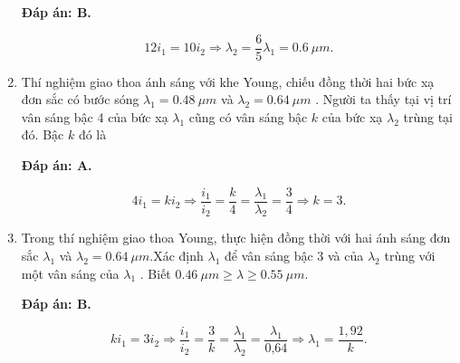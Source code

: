 \begin{enumerate}[label=\bfseries Câu \arabic*:]
{		
	}
	
	\loigiai
	{		\textbf{Đáp án: B.}
		
		$$12i_1 = 10i_2 \Rightarrow \lambda_2 = \dfrac{6}{5} \lambda_1 = \SI{0,6}{\mu m}.$$
	}
		\item {} 
	\cauhoi
	{Thí nghiệm giao thoa ánh sáng với khe Young, chiếu đồng thời hai bức xạ đơn sắc có bước sóng $\lambda_1 = \SI{0,48}{\mu m}$  và $\lambda_2 = \SI{0,64}{\mu m}$  . Người ta thấy tại vị trí vân sáng bậc 4 của bức xạ $\lambda_1$ cũng có vân sáng bậc $k$ của bức xạ $\lambda_2$ trùng tại đó. Bậc $k$ đó là
		
	}
	
	\loigiai
	{		\textbf{Đáp án: A.}
		
		$$4i_1 = ki_2 \Rightarrow \dfrac{i_1}{i_2} = \dfrac{k}{4} = \dfrac{\lambda_1}{\lambda_2} = \dfrac{3}{4} \Rightarrow k  = 3.$$
	}
		\item {} 
	\cauhoi
	{Trong thí nghiệm giao thoa Young, thực hiện đồng thời với hai ánh sáng đơn sắc $\lambda_1$  và $\lambda_2 = \SI{0,64}{\mu m}$.Xác định $\lambda_1$  để vân sáng bậc 3 và của $\lambda_2$  trùng với một vân sáng của $\lambda_1$ . Biết $\SI{0,46}{\mu m} \geq \lambda \geq \SI{0,55}{\mu m}.$  
		
	}
	
	\loigiai
	{		\textbf{Đáp án: B.}
		
		$$ki_1 = 3i_2 \Rightarrow \dfrac{i_1}{i_2} = \dfrac{3}{k} = \dfrac{\lambda_1}{\lambda_2} = \dfrac{\lambda_1}{\text{0,64}} \Rightarrow \lambda_1 = \dfrac{1,92}{k}.$$
		
}
\end{enumerate}
